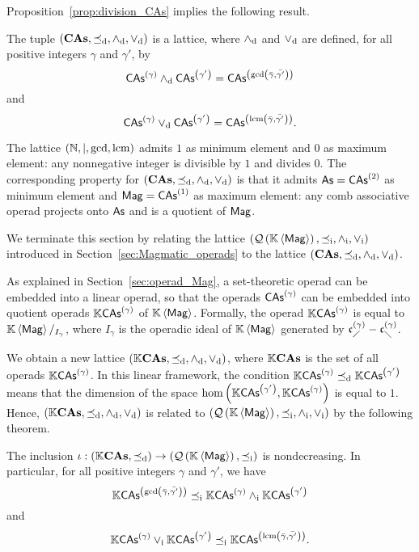 Proposition~\ref{prop:division_CAs} implies the following result.
\medbreak

\begin{Theorem}\label{thm:lattice_CAs}
  The tuple $\LatCAs$ is a lattice, where $\InfCAs$ and $\SupCAs$ are
  defined, for all positive integers $\gamma$ and $\gamma'$, by
    \begin{equation}
      \CAs{\gamma}\InfCAs\CAs{\gamma'}
      =\CAs{\gcd \left(\bar{\gamma}, \bar{\gamma'}\right)}
    \end{equation}
    and
    \begin{equation}
      \CAs{\gamma}\SupCAs\CAs{\gamma'}
      =\CAs{\lcm \left(\bar{\gamma}, \bar{\gamma'}\right)}.
    \end{equation}
\end{Theorem}
\medbreak

The lattice $\left(\N,\mid, \gcd, \lcm\right)$ admits $1$ as minimum
element and $0$ as maximum element: any nonnegative integer is
divisible by $1$ and divides $0$. The corresponding property for
$\LatCAs$ is that it admits $\As=\CAs{2}$ as minimum element and $\Mag=
\CAs{1}$ as maximum element: any comb associative operad projects onto
$\As$ and is a quotient of $\Mag$.

We terminate this section by relating the lattice
$\LatQMag$ introduced in Section~\ref{sec:Magmatic_operads} to the
lattice $\LatCAs$.

As explained in Section~\ref{sec:operad_Mag}, a set-theoretic operad can
be embedded into a linear operad, so that the operads $\CAs{\gamma}$ can
be embedded into quotient operads $\KCAs{\gamma}$ of $\KMag$. Formally,
the operad $\KCAs{\gamma}$ is equal to $\KMag/_{I_{\gamma}}$, where
$I_{\gamma}$ is the operadic ideal of $\KMag$ generated by
$\LComb{\gamma}-\RComb{\gamma}$.

We obtain a new lattice $\LatKCAs$, where $\KCAsAll$ is the set of all
operads $\KCAs{\gamma}$. In this linear framework, the condition
$\KCAs{\gamma}\OrdCAs\KCAs{\gamma'}$ means that the dimension of the
space $\text{hom}\left(\KCAs{\gamma'},\KCAs{\gamma}\right)$ is equal to
$1$. Hence, $\LatKCAs$ is related to $\LatQMag$ by the following
theorem.

\begin{Theorem} \label{thm:inclusion_lattice_CAs}
    The inclusion
    \begin{math}
        \iota:\left(\KCAsAll,\OrdCAs\right)
        \to
        \left(\QMag,\OrdQMag\right)
    \end{math}
    is nondecreasing. In particular, for all positive integers $\gamma$
    and $\gamma'$, we have
    \begin{equation} \label{equ:comparison_of_lattice_operations}
        \KCAs{\gcd \left(\bar{\gamma}, \bar{\gamma'}\right)}
        \OrdQMag
        \KCAs{\gamma}\InfQMag\KCAs{\gamma'}
    \end{equation}
    and
    \begin{equation}
        \KCAs{\gamma}\SupQMag\KCAs{\gamma'}
        \OrdQMag
        \KCAs{\lcm \left(\bar{\gamma}, \bar{\gamma'}\right)}.
    \end{equation}
\end{Theorem}
\medbreak

